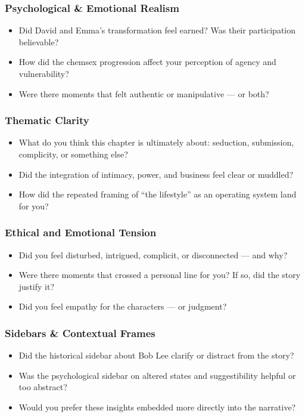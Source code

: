 \subsubsection{Psychological \& Emotional Realism}

\begin{itemize}
  \item Did David and Emma’s transformation feel earned? Was their participation believable?
  \item How did the chemsex progression affect your perception of agency and vulnerability?
  \item Were there moments that felt authentic or manipulative — or both?
\end{itemize}

\subsubsection{Thematic Clarity}

\begin{itemize}
  \item What do you think this chapter is ultimately about: seduction, submission, complicity, or something else?
  \item Did the integration of intimacy, power, and business feel clear or muddled?
  \item How did the repeated framing of “the lifestyle” as an operating system land for you?
\end{itemize}

\subsubsection{Ethical and Emotional Tension}

\begin{itemize}
  \item Did you feel disturbed, intrigued, complicit, or disconnected — and why?
  \item Were there moments that crossed a personal line for you? If so, did the story justify it?
  \item Did you feel empathy for the characters — or judgment?
\end{itemize}

\subsubsection{Sidebars \& Contextual Frames}

\begin{itemize}
  \item Did the historical sidebar about Bob Lee clarify or distract from the story?
  \item Was the psychological sidebar on altered states and suggestibility helpful or too abstract?
  \item Would you prefer these insights embedded more directly into the narrative?
\end{itemize}

